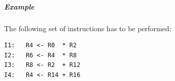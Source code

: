 


\subparagraph{Example}
The following set of instructions has to be performed:

\begin{verbatim}
I1:   R4 <- R0  * R2
I2:   R6 <- R4  * R8
I3:   R8 <- R2  + R12
I4:   R4 <- R14 + R16
\end{verbatim}

